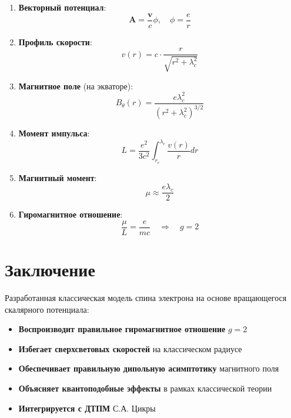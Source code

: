 \documentclass[12pt,a4paper]{article}
\begin{document}
\begin{enumerate}
    \item \textbf{Векторный потенциал}:
    \begin{equation}
        \mathbf{A} = \frac{\mathbf{v}}{c} \phi, \quad \phi = \frac{e}{r}
    \end{equation}

    \item \textbf{Профиль скорости}:
    \begin{equation}
        v(r) = c \cdot \frac{r}{\sqrt{r^2 + \lambda_c^2}}
    \end{equation}

    \item \textbf{Магнитное поле} (на экваторе):
    \begin{equation}
        B_\theta(r) = \frac{e \lambda_c^2}{(r^2 + \lambda_c^2)^{3/2}}
    \end{equation}

    \item \textbf{Момент импульса}:
    \begin{equation}
        L = \frac{e^2}{3c^2} \int_{r_e}^{\lambda_c} \frac{v(r)}{r} dr
    \end{equation}

    \item \textbf{Магнитный момент}:
    \begin{equation}
        \mu \approx \frac{e \lambda_c}{2}
    \end{equation}

    \item \textbf{Гиромагнитное отношение}:
    \begin{equation}
        \frac{\mu}{L} = \frac{e}{mc} \quad \Rightarrow \quad g = 2
    \end{equation}
\end{enumerate}

\section*{Заключение}

Разработанная классическая модель спина электрона на основе вращающегося скалярного потенциала:

\begin{itemize}
    \item[\checkmark] \textbf{Воспроизводит правильное гиромагнитное отношение} $g = 2$
    \item[\checkmark] \textbf{Избегает сверхсветовых скоростей} на классическом радиусе
    \item[\checkmark] \textbf{Обеспечивает правильную дипольную асимптотику} магнитного поля
    \item[\checkmark] \textbf{Объясняет квантоподобные эффекты} в рамках классической теории
    \item[\checkmark] \textbf{Интегрируется с ДТПМ} С.А. Цикры
\end{itemize}
\end{document}
